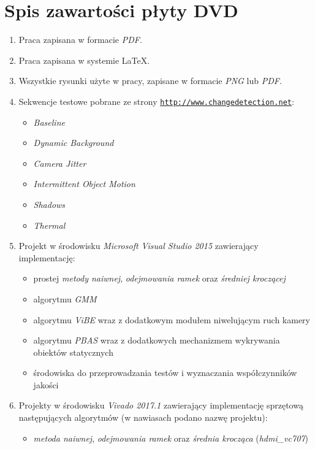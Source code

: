 
\chapter{Spis zawartości płyty DVD}
\label{appx:plyta}

\begin{enumerate}
\item{Praca zapisana w formacie \textit{\small{PDF}}.}
\item{Praca zapisana w systemie \LaTeX.}
\item{Wszystkie rysunki użyte w pracy, zapisane w formacie \textit{\small{PNG}} lub \textit{\small{PDF}}.}
\item{
		Sekwencje testowe pobrane ze strony \underline{\texttt{\small{http://www.changedetection.net}}}:
		\begin{itemize}
			\setlength\itemsep{0em}
			\item{\textit{Baseline}}
			\item{\textit{Dynamic Background}}
			\item{\textit{Camera Jitter}}
			\item{\textit{Intermittent Object Motion}}
			\item{\textit{Shadows}}
			\item{\textit{Thermal}}
		\end{itemize}
}
\item{
		Projekt w środowisku \textit{Microsoft Visual Studio 2015} zawierający implementację:
		\begin{itemize}
			\setlength\itemsep{0em}
			\item{prostej \textit{metody naiwnej}, \textit{odejmowania ramek} oraz \textit{średniej kroczącej}}
			\item{algorytmu \textit{GMM}}
			\item{algorytmu \textit{ViBE} wraz z dodatkowym modułem niwelującym ruch kamery}
			\item{algorytmu \textit{PBAS} wraz z dodatkowych mechanizmem wykrywania obiektów statycznych}
			\item{środowiska do przeprowadzania testów i wyznaczania współczynników jakości}
		\end{itemize}				
}
\item{Projekty w środowisku \textit{Vivado 2017.1} zawierający implementację sprzętową następujących algorytmów (w nawiasach podano nazwę projektu):
		\begin{itemize}
			\setlength\itemsep{0em}
			\item{\textit{metoda naiwnej}, \textit{odejmowania ramek} oraz \textit{średnia krocząca} (\textit{hdmi\_vc707})}

\end{itemize}}
\end{enumerate}
